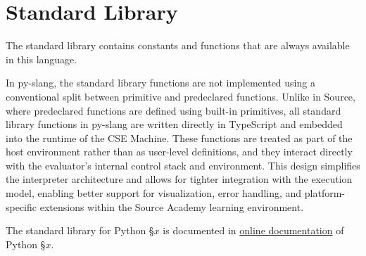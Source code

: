 \section{Standard Library}

The standard library contains constants and functions that are 
always available in this language. 

In py-slang, the standard library functions are not implemented 
using a conventional split between primitive and predeclared 
functions. Unlike in Source, where predeclared functions are 
defined using built-in primitives, all standard library functions 
in py-slang are written directly in TypeScript and embedded into 
the runtime of the CSE Machine. These functions are treated as 
part of the host environment rather than as user-level definitions, 
and they interact directly with the evaluator's internal control 
stack and environment. This design simplifies the interpreter 
architecture and allows for tighter integration with the execution 
model, enabling better support for visualization, error handling, 
and platform-specific extensions within the Source Academy learning 
environment.

The standard library for Python \S $x$ is documented in
\href{https://docs.sourceacademy.org/python/}{\color{DarkBlue}online documentation} of Python \S $x$.
